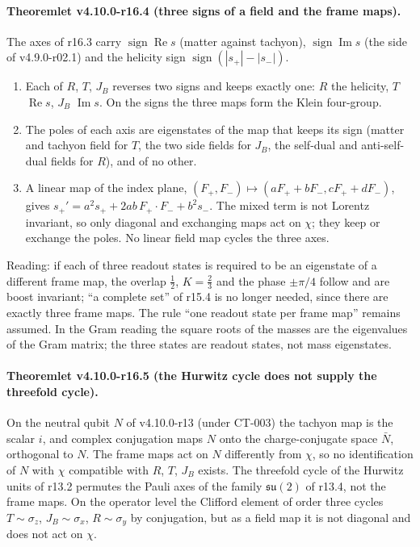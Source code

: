 \paragraph{Theoremlet v4.10.0-r16.4 (three signs of a field and the frame maps).}
The axes of r16.3 carry \(\operatorname{sign}\operatorname{Re}s\) (matter against tachyon), \(\operatorname{sign}\operatorname{Im}s\) (the side
of v4.9.0-r02.1) and the helicity sign \(\operatorname{sign}(|s_+|-|s_-|)\).
\begin{enumerate}[leftmargin=2em]
\item[(a)] Each of \(R\), \(T\), \(J_B\) reverses two signs and keeps exactly one: \(R\) the helicity, \(T\) \(\operatorname{Re}s\), \(J_B\)
\(\operatorname{Im}s\).  On the signs the three maps form the Klein four-group.
\item[(b)] The poles of each axis are eigenstates of the map that keeps its sign (matter and tachyon field for \(T\), the two
side fields for \(J_B\), the self-dual and anti-self-dual fields for \(R\)), and of no other.
\item[(c)] A linear map of the index plane, \((F_+,F_-)\mapsto(aF_++bF_-,cF_++dF_-)\), gives
\(s_+'=a^2s_++2ab\,F_+\cdot F_-+b^2s_-\).  The mixed term is not Lorentz invariant, so only diagonal and exchanging maps act on
\(\chi\); they keep or exchange the poles.  No linear field map cycles the three axes.
\end{enumerate}
Reading: if each of three readout states is required to be an eigenstate of a different frame map, the overlap \(\tfrac12\),
\(K=\tfrac23\) and the phase \(\pm\pi/4\) follow and are boost invariant; ``a complete set'' of r15.4 is no longer needed, since
there are exactly three frame maps.  The rule ``one readout state per frame map'' remains assumed.  In the Gram reading the
square roots of the masses are the eigenvalues of the Gram matrix; the three states are readout states, not mass eigenstates.

\paragraph{Theoremlet v4.10.0-r16.5 (the Hurwitz cycle does not supply the threefold cycle).}
On the neutral qubit \(N\) of v4.10.0-r13 (under CT-003) the tachyon map is the scalar \(i\), and complex conjugation maps
\(N\) onto the charge-conjugate space \(\bar N\), orthogonal to \(N\).  The frame maps act on \(N\) differently from \(\chi\), so no
identification of \(N\) with \(\chi\) compatible with \(R\), \(T\), \(J_B\) exists.  The threefold cycle of the Hurwitz units of r13.2
permutes the Pauli axes of the family \(\mathfrak{su}(2)\) of r13.4, not the frame maps.  On the operator level the Clifford
element of order three cycles \(T\sim\sigma_z\), \(J_B\sim\sigma_x\), \(R\sim\sigma_y\) by conjugation, but as a field map it is not
diagonal and does not act on \(\chi\).


